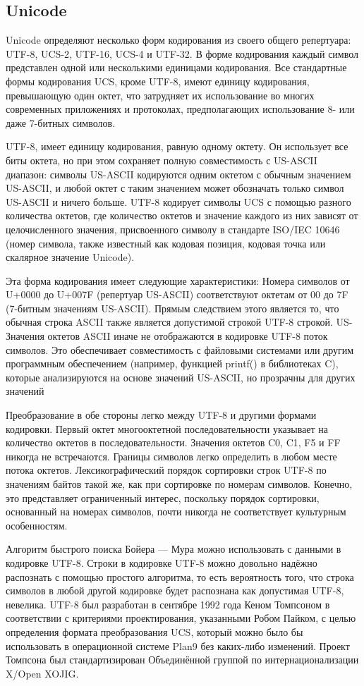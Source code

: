 \documentclass{ou}
\begin{document}
\subsection{Unicode}
Unicode определяют несколько форм кодирования из своего общего репертуара: UTF-8, UCS-2, UTF-16, UCS-4 и UTF-32. В форме кодирования каждый символ представлен одной или несколькими единицами кодирования. Все стандартные формы кодирования UCS, кроме UTF-8, имеют единицу кодирования, превышающую один октет, что затрудняет их использование во многих современных приложениях и протоколах, предполагающих использование 8- или даже 7-битных символов.

UTF-8, имеет единицу кодирования, равную одному октету. Он использует все биты октета, но при этом сохраняет полную совместимость с US-ASCII диапазон: символы US-ASCII кодируются одним октетом с обычным значением US-ASCII, и любой октет с таким значением может обозначать только символ US-ASCII и ничего больше. UTF-8 кодирует символы UCS с помощью разного количества октетов, где количество октетов и значение каждого из них зависят от целочисленного значения, присвоенного символу в стандарте ISO/IEC 10646 (номер символа, также известный как кодовая позиция, кодовая точка или скалярное значение Unicode).

Эта форма кодирования имеет следующие характеристики: Номера символов от U+0000 до U+007F (репертуар US-ASCII) соответствуют октетам от 00 до 7F (7-битным значениям US-ASCII). Прямым следствием этого является то, что обычная строка ASCII также является допустимой строкой UTF-8 строкой. US-Значения октетов ASCII иначе не отображаются в кодировке UTF-8 поток символов. Это обеспечивает совместимость с файловыми системами или другим программным обеспечением (например, функцией printf() в библиотеках C), которые анализируются на основе значений US-ASCII, но прозрачны для других значений 

 Преобразование в обе стороны легко между UTF-8 и другими формами кодировки. Первый октет многооктетной последовательности указывает на количество октетов в последовательности. Значения октетов C0, C1, F5 и FF никогда не встречаются. Границы символов легко определить в любом месте потока октетов. Лексикографический порядок сортировки строк UTF-8 по значениям байтов такой же, как при сортировке по номерам символов. Конечно, это представляет ограниченный интерес, поскольку порядок сортировки, основанный на номерах символов, почти никогда не соответствует культурным особенностям.
 
  Алгоритм быстрого поиска Бойера — Мура можно использовать с данными в кодировке UTF-8. Строки в кодировке UTF-8 можно довольно надёжно распознать с помощью простого алгоритма, то есть вероятность того, что строка символов в любой другой кодировке будет распознана как допустимая UTF-8, невелика. UTF-8 был разработан в сентябре 1992 года Кеном Томпсоном в соответствии с критериями проектирования, указанными Робом Пайком, с целью определения формата преобразования UCS, который можно было бы использовать в операционной системе Plan9 без каких-либо изменений. Проект Томпсона был стандартизирован Объединённой группой по интернационализации X/Open XOJIG.
  
\end{document}
